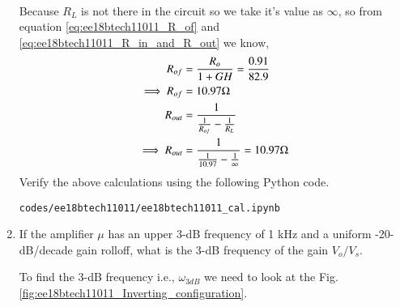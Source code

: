 \begin{enumerate}[label=\thesection.\arabic*.,ref=\thesection.\theenumi]
\begin{align}
\end{align}
%
Because $R_{L}$ is not there in the circuit so we take it's value as $\infty$, so from equation \ref{eq:ee18btech11011_R_of} and \ref{eq:ee18btech11011_R_in_and_R_out} we know,
%
\begin{align}
R_{o f} &= \frac{R_{o}}{1+GH} = \frac{0.91}{82.9}
\\
\implies R_{o f} &= 10.97\ohm
\\
R_{o u t} &= \frac{1}{\frac{1}{R_{o f}} - \frac{1}{R_{L}}}
\\
\implies R_{o u t} &= \frac{1}{\frac{1}{10.97} - \frac{1}{\infty}} = 10.97\ohm
\end{align}
%
Verify the above calculations using the following Python code.
\begin{lstlisting}
codes/ee18btech11011/ee18btech11011_cal.ipynb
\end{lstlisting}
%
\item If the amplifier $\mu$ has an upper 3-dB frequency of 1 kHz and a uniform -20-dB/decade gain rolloff, what is the 3-dB frequency of the gain \mid$V_{o}/V_{s}$\mid.

\solution To find the 3-dB frequency i.e., $\omega_{3 d B}$ we need to look at the Fig.\ref{fig:ee18btech11011_Inverting_configuration}.


\end{enumerate}

